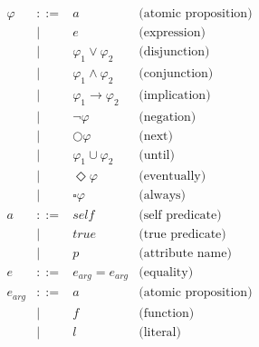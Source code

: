 \[
\begin{array}{rcll}
    \varphi     & ::=   & a                                 & \text{(atomic proposition)} \\
                & |     & e                                 & \text{(expression)} \\
                & |     & \varphi_1 \vee \varphi_2          & \text{(disjunction)} \\
                & |     & \varphi_1 \wedge \varphi_2        & \text{(conjunction)} \\
                & |     & \varphi_1 \rightarrow \varphi_2   & \text{(implication)} \\
                & |     & \neg \varphi                      & \text{(negation)} \\
                & |     & \bigcirc \varphi                  & \text{(next)} \\
                & |     & \varphi_1 \cup \varphi_2       & \text{(until)} \\
                & |     & \Diamond \varphi                  & \text{(eventually)} \\
                & |     & \square \varphi                   & \text{(always)} \\
    a           & ::=   & self                              & \text{(self predicate)} \\
                & |     & true                              & \text{(true predicate)} \\
                & |     & p                                 & \text{(attribute name)} \\
    e           & ::=   & e_{arg} = e_{arg}                 & \text{(equality)} \\
    e_{arg}     & ::=   & a                                 & \text{(atomic proposition)} \\
                & |     & f                                 & \text{(function)} \\
                & |     & l                                 & \text{(literal)} \\

\end{array}\]
